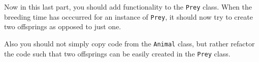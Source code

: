 
Now in this last part, you should add functionality to the \texttt{Prey} class.
When the breeding time has occcurred for an instance of \texttt{Prey},
it should now try to create two offsprings as opposed to just one.

Also you should not simply copy code from the \texttt{Animal} class,
but rather refactor the code such that two offsprings can be easily created in the \texttt{Prey} class.
